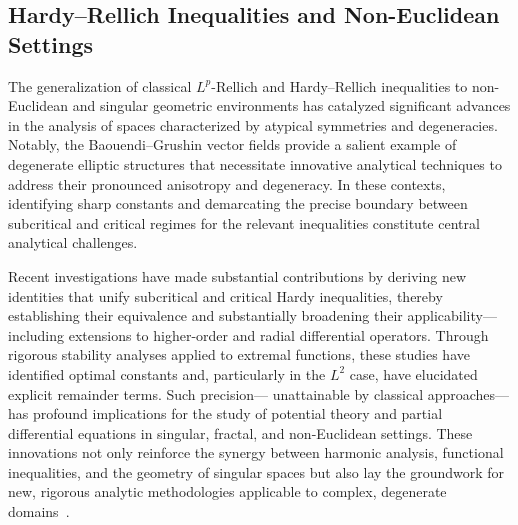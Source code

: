 \subsection{Hardy--Rellich Inequalities and Non-Euclidean Settings}

The generalization of classical $L^p$-Rellich and Hardy--Rellich inequalities to non-Euclidean and singular geometric environments has catalyzed significant advances in the analysis of spaces characterized by atypical symmetries and degeneracies. Notably, the Baouendi--Grushin vector fields provide a salient example of degenerate elliptic structures that necessitate innovative analytical techniques to address their pronounced anisotropy and degeneracy. In these contexts, identifying sharp constants and demarcating the precise boundary between subcritical and critical regimes for the relevant inequalities constitute central analytical challenges.

Recent investigations have made substantial contributions by deriving new identities that unify subcritical and critical Hardy inequalities, thereby establishing their equivalence and substantially broadening their applicability—including extensions to higher-order and radial differential operators. Through rigorous stability analyses applied to extremal functions, these studies have identified optimal constants and, particularly in the $L^2$ case, have elucidated explicit remainder terms. Such precision— unattainable by classical approaches—has profound implications for the study of potential theory and partial differential equations in singular, fractal, and non-Euclidean settings. These innovations not only reinforce the synergy between harmonic analysis, functional inequalities, and the geometry of singular spaces but also lay the groundwork for new, rigorous analytic methodologies applicable to complex, degenerate domains~\cite{ref105}.

